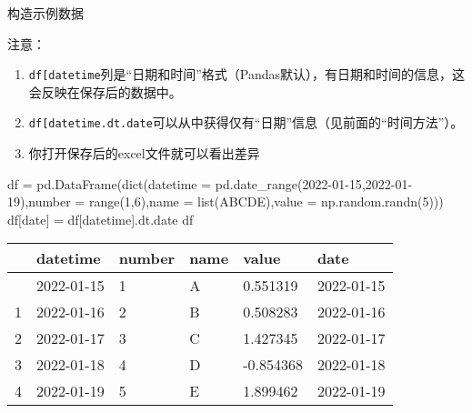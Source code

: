 \documentclass[
  letterpaper,
  DIV=11,
  numbers=noendperiod]{scrreprt}
\newenvironment{Shaded}{\begin{snugshade}}{\end{snugshade}}
\newcommand{\BuiltInTok}[1]{\textcolor[rgb]{0.00,0.23,0.31}{#1}}
\newcommand{\DecValTok}[1]{\textcolor[rgb]{0.68,0.00,0.00}{#1}}
\newcommand{\NormalTok}[1]{\textcolor[rgb]{0.00,0.23,0.31}{#1}}
\newcommand{\OperatorTok}[1]{\textcolor[rgb]{0.37,0.37,0.37}{#1}}
\newcommand{\StringTok}[1]{\textcolor[rgb]{0.13,0.47,0.30}{#1}}
\providecommand{\tightlist}{%
  \setlength{\itemsep}{0pt}\setlength{\parskip}{0pt}}\usepackage{longtable,booktabs,array}
\begin{document}
构造示例数据

注意：

\begin{enumerate}
\def\labelenumi{\arabic{enumi}.}
\tightlist
\item
  \texttt{df{[}\textquotesingle{}datetime\textquotesingle{}{]}}列是``日期和时间''格式（Pandas默认），有日期和时间的信息，这会反映在保存后的数据中。
\item
  \texttt{df{[}\textquotesingle{}datetime\textquotesingle{}{]}.dt.date}可以从中获得仅有``日期''信息（见前面的``时间方法''）。
\item
  你打开保存后的excel文件就可以看出差异
\end{enumerate}

\begin{Shaded}
\begin{Highlighting}[]
\NormalTok{df  }\OperatorTok{=}\NormalTok{  pd.DataFrame(}\BuiltInTok{dict}\NormalTok{(datetime }\OperatorTok{=}\NormalTok{ pd.date\_range(}\StringTok{\textquotesingle{}2022{-}01{-}15\textquotesingle{}}\NormalTok{,}\StringTok{\textquotesingle{}2022{-}01{-}19\textquotesingle{}}\NormalTok{),number }\OperatorTok{=} \BuiltInTok{range}\NormalTok{(}\DecValTok{1}\NormalTok{,}\DecValTok{6}\NormalTok{),name }\OperatorTok{=} \BuiltInTok{list}\NormalTok{(}\StringTok{\textquotesingle{}ABCDE\textquotesingle{}}\NormalTok{),value }\OperatorTok{=}\NormalTok{ np.random.randn(}\DecValTok{5}\NormalTok{)))}
\NormalTok{df[}\StringTok{\textquotesingle{}date\textquotesingle{}}\NormalTok{] }\OperatorTok{=}\NormalTok{ df[}\StringTok{\textquotesingle{}datetime\textquotesingle{}}\NormalTok{].dt.date}
\NormalTok{df}
\end{Highlighting}
\end{Shaded}

\begin{longtable}[]{@{}llllll@{}}
\toprule\noalign{}
& datetime & number & name & value & date \\
\midrule\noalign{}
\endhead
\bottomrule\noalign{}
\endlastfoot
0 & 2022-01-15 & 1 & A & 0.551319 & 2022-01-15 \\
1 & 2022-01-16 & 2 & B & 0.508283 & 2022-01-16 \\
2 & 2022-01-17 & 3 & C & 1.427345 & 2022-01-17 \\
3 & 2022-01-18 & 4 & D & -0.854368 & 2022-01-18 \\
4 & 2022-01-19 & 5 & E & 1.899462 & 2022-01-19 \\
\end{longtable}
\end{document}
